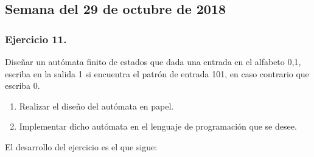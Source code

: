 \documentclass[11pt,a4paper]{article}
\begin{document}
\begin{figure}[H]
\centering
{}
\end{figure}	

\subsection{Semana del 29 de octubre de 2018}

\subsubsection{Ejercicio 11.} Diseñar un autómata finito de estados que dada una entrada en el alfabeto {0,1}, escriba en la salida 1 si encuentra el patrón de entrada 101, en caso contrario que escriba 0.
	\begin{enumerate}
	\item Realizar el diseño del autómata en papel.
	\item Implementar dicho autómata en el lenguaje de 				programación que se desee.
	\end{enumerate}
	
El desarrollo del ejercicio es el que sigue:
	
\end{document}
